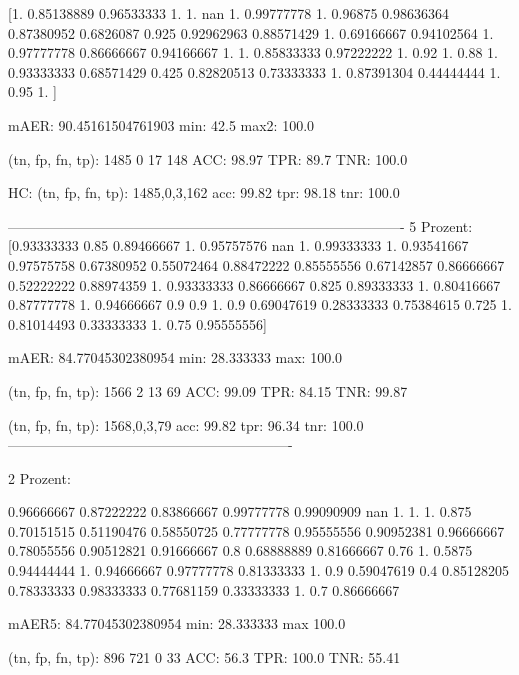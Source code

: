 \documentclass[11pt,a4paper]{article}
\numberwithin{equation}{section}
\begin{document}
	[1.         0.85138889 0.96533333 1.         1.                nan
	1.         0.99777778 1.         0.96875    0.98636364 0.87380952
	0.6826087  0.925      0.92962963 0.88571429 1.         0.69166667
	0.94102564 1.         0.97777778 0.86666667 0.94166667 1.
	1.         0.85833333 0.97222222 1.         0.92       1.
	0.88       1.         0.93333333 0.68571429 0.425      0.82820513
	0.73333333 1.         0.87391304 0.44444444 1.         0.95
	1.        ]
	
	
	mAER:  90.45161504761903
	min:  42.5
	max2:  100.0
	
	(tn, fp, fn, tp):  1485 0 17 148
	ACC: 98.97
	TPR:  89.7
	TNR:  100.0
	
	HC: (tn, fp, fn, tp): 1485,0,3,162
	acc: 99.82
	tpr: 98.18
	tnr: 100.0
	
	-------------------------------------------------------------------------------------
	5 Prozent:
	[0.93333333 0.85       0.89466667 1.         0.95757576        nan
	1.         0.99333333 1.         0.93541667 0.97575758 0.67380952
	0.55072464 0.88472222 0.85555556 0.67142857 0.86666667 0.52222222
	0.88974359 1.         0.93333333 0.86666667 0.825      0.89333333
	1.         0.80416667 0.87777778 1.         0.94666667 0.9
	0.9        1.         0.9        0.69047619 0.28333333 0.75384615
	0.725      1.         0.81014493 0.33333333 1.         0.75
	0.95555556]
	
	mAER:  84.77045302380954
	min:  28.333333
	max:  100.0
	
	(tn, fp, fn, tp):  1566 2 13 69
	ACC: 99.09
	TPR:  84.15
	TNR:  99.87
	
	
	(tn, fp, fn, tp): 1568,0,3,79
	acc: 99.82
	tpr: 96.34
	tnr: 100.0
	-------------------------------------------------------------
	
	2 Prozent:
	
	0.96666667 0.87222222 0.83866667 0.99777778 0.99090909        nan
	1.         1.         1.         0.875      0.70151515 0.51190476
	0.58550725 0.77777778 0.95555556 0.90952381 0.96666667 0.78055556
	0.90512821 0.91666667 0.8        0.68888889 0.81666667 0.76
	1.         0.5875     0.94444444 1.         0.94666667 0.97777778
	0.81333333 1.         0.9        0.59047619 0.4        0.85128205
	0.78333333 0.98333333 0.77681159 0.33333333 1.         0.7
	0.86666667
	
	mAER5:  84.77045302380954
	min:  28.333333
	max  100.0
	
	(tn, fp, fn, tp):  896 721 0 33
	ACC: 56.3
	TPR:  100.0
	TNR:  55.41
	
	
	
\end{document}
